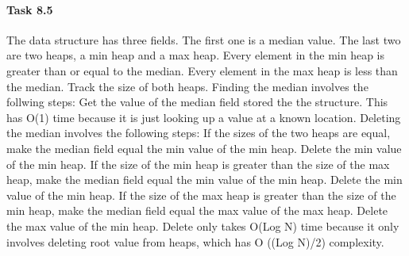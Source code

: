 \documentclass[11pt]{article}
\begin{document}
\paragraph{Task 8.5}
\newline The data structure has three fields. The first one is a median value. The last two are two heaps, a min heap and a max heap. Every element in the min heap is greater than or equal to the median. Every element in the max heap is less than the median.
\newline Track the size of both heaps.
\newline Finding the median involves the follwing steps:
\newline Get the value of the median field stored the the structure. This has O(1) time because it is just looking up a value at a known location.
\newline Deleting the median involves the following steps:
\newline If the sizes of the two heaps are equal, make the median field equal the min value of the min heap. Delete the min value of the min heap. If the size of the min heap is greater than the size of the max heap, make the median field equal the min value of the min heap. Delete the min value of the min heap. If the size of the max heap is greater than the size of the min heap, make the median field equal the max value of the max heap. Delete the max value of the min heap. Delete only takes O(Log N) time because it only involves deleting root value from heaps, which has O ((Log N)/2) complexity.





\label{mylastpagelabel}
\end{document}
